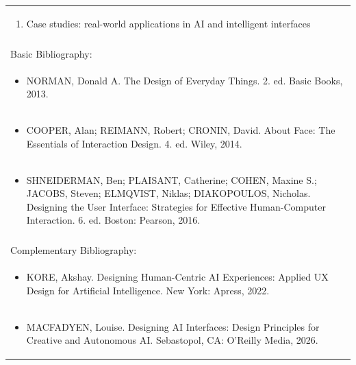\documentclass[11pt]{article}
\begin{document}
\begin{center}
\begin{longtable}{|p{4cm}|p{4cm}|p{4cm}|p{4cm}|}
\multicolumn{4}{|p{\dimexpr 16cm + 6\tabcolsep\relax}|}{\begin{enumerate}[start=10]\item Case studies: real-world applications in AI and intelligent interfaces\end{enumerate}}\\
\multicolumn{4}{|p{\dimexpr 16cm + 6\tabcolsep\relax}|}{}\\
\hline
\multicolumn{4}{|p{16cm}|}{Basic Bibliography:}\\*
\multicolumn{4}{|p{\dimexpr 16cm + 6\tabcolsep\relax}|}{\begin{itemize}\item NORMAN, Donald A. The Design of Everyday Things. 2. ed. Basic Books, 2013.\end{itemize}}\\
\multicolumn{4}{|p{\dimexpr 16cm + 6\tabcolsep\relax}|}{\begin{itemize}\item COOPER, Alan; REIMANN, Robert; CRONIN, David. About Face: The Essentials of Interaction Design. 4. ed. Wiley, 2014.\end{itemize}}\\
\multicolumn{4}{|p{\dimexpr 16cm + 6\tabcolsep\relax}|}{\begin{itemize}\item SHNEIDERMAN, Ben; PLAISANT, Catherine; COHEN, Maxine S.; JACOBS, Steven; ELMQVIST, Niklas; DIAKOPOULOS, Nicholas. Designing the User Interface: Strategies for Effective Human-Computer Interaction. 6. ed. Boston: Pearson, 2016.\end{itemize}}\\
\multicolumn{4}{|p{16cm}|}{}\\
\hline
\multicolumn{4}{|p{16cm}|}{Complementary Bibliography:}\\*
\multicolumn{4}{|p{\dimexpr 16cm + 6\tabcolsep\relax}|}{\begin{itemize}\item KORE, Akshay. Designing Human-Centric AI Experiences: Applied UX Design for Artificial Intelligence. New York: Apress, 2022.\end{itemize}}\\
\multicolumn{4}{|p{\dimexpr 16cm + 6\tabcolsep\relax}|}{\begin{itemize}\item MACFADYEN, Louise. Designing AI Interfaces: Design Principles for Creative and Autonomous AI. Sebastopol, CA: O'Reilly Media, 2026.\end{itemize}}\\

\end{longtable}
\end{center}
\end{document}
